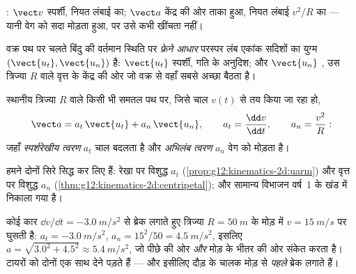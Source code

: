 \begin{omfigure}

{\small {}: $\vect v$ स्पर्शी, नियत लंबाई का; $\vect a$
केंद्र की ओर ताका हुआ, नियत लंबाई $v^2/R$ का --- यानी वेग को सदा मोड़ता हुआ,
पर उसे कभी खींचता नहीं।}
\end{omfigure}

\begin{definition}[फ्रेने आधार]\label{def:g12:kinematics-2d:frenet}
वक्र पथ पर चलते बिंदु की वर्तमान स्थिति पर \emph{फ्रेने आधार} परस्पर लंब एकांक सदिशों का युग्म $(\vect{u_t}, \vect{u_n})$ है: $\vect{u_t}$ स्पर्शी,
गति के अनुदिश; और $\vect{u_n}$ , उस त्रिज्या $R$ वाले वृत्त के केंद्र की
ओर जो वक्र से वहाँ सबसे अच्छा बैठता है।
\end{definition}

\begin{proposition}[फ्रेने आधार में त्वरण]\label{prop:g12:kinematics-2d:frenetacc}
स्थानीय त्रिज्या $R$ वाले किसी भी समतल पथ पर, जिसे चाल $v(t)$
से तय किया जा रहा हो,
\[
\vect a = a_t\,\vect{u_t} + a_n\,\vect{u_n},
\qquad a_t = \frac{\dd v}{\dd t},
\qquad a_n = \frac{v^2}{R}:
\]
जहाँ \emph{स्पर्शरेखीय त्वरण} $a_t$
चाल बदलता है और \emph{अभिलंब त्वरण} $a_n$ वेग
को मोड़ता है।
\end{proposition}
\admitted

\begin{remark}\label{rem:g12:kinematics-2d:frenetproof}
हमने दोनों सिरे सिद्ध कर लिए हैं: रेखा पर विशुद्ध $a_t$ (\cref{prop:g12:kinematics-2d:uarm}) और वृत्त
पर विशुद्ध $a_n$ (\cref{thm:g12:kinematics-2d:centripetal}); और सामान्य विभाजन वर्ष~1 के खंड में निकाला गया
है।
\end{remark}

\begin{example}[मोड़ में ब्रेक]\label{ex:g12:kinematics-2d:bend}
कोई कार $\dd v/\dd t = \qty{-3.0}{m/s^2}$ से ब्रेक लगाते हुए त्रिज्या $R = \qty{50}{m}$ के मोड़ में $v = \qty{15}{m/s}$ पर
घुसती है: $a_t =
\qty{-3.0}{m/s^2}$, $a_n = 15^2/50 = \qty{4.5}{m/s^2}$, इसलिए $a =
\sqrt{3.0^2 + 4.5^2} \approx \qty{5.4}{m/s^2}$, जो पीछे की ओर \emph{और} मोड़ के
भीतर की ओर संकेत करता है। टायरों को दोनों एक साथ देने पड़ते हैं --- और इसीलिए
दौड़ के चालक मोड़ से \emph{पहले} ब्रेक लगाते हैं।
\end{example}

